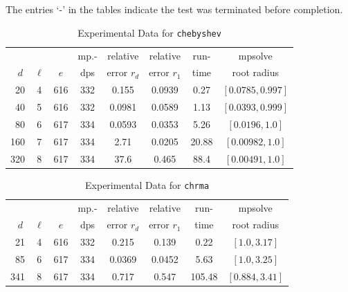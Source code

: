 \documentclass[runningheads]{llncs}
\begin{document}
 The entries `-' in the tables indicate the test was terminated before completion.


\begin{table}
\caption{Experimental Data for \texttt{chebyshev}} %
\label{tab:chebyshev}
\vskip -0.15in
\begin{center}
\begin{small}
\begin{sc}
\begin{tabular}{rccccccc}
\toprule
&  &  & mp.-& relative  & relative & run- & mpsolve \\
$d~$& $\ell$& $e$ & dps&error $r_d$       & error $r_1$ &time& root radius\\
\midrule
 20 & 4 & 616 & 332 & 0.155 & 0.0939 & 0.27 & $[0.0785, 0.997]$\\
 40 & 5 & 616 & 332 & 0.0981 & 0.0589 & 1.13 & $[0.0393, 0.999]$\\
 80 & 6 & 617 & 334 & 0.0593 & 0.0353 & 5.26 & $[0.0196, 1.0]$\\
 160 & 7 & 617 & 334 & 2.71 & 0.0205 & 20.88 & $[0.00982, 1.0]$\\
 320 & 8 & 617 & 334 & 37.6 & 0.465 & 88.4 & $[0.00491, 1.0]$\\
\bottomrule
\end{tabular}
\end{sc}
\end{small}
\end{center}
\vskip 0.05in
\end{table}

\begin{table}
\caption{Experimental Data for \texttt{chrma}} %
\label{tab:chrma}
\vskip -0.15in
\begin{center}
\begin{small}
\begin{sc}
\begin{tabular}{rccccccc}
\toprule
&  &  & mp.-& relative  & relative & run- & mpsolve \\
$d~$& $\ell$& $e$ & dps&error $r_d$       & error $r_1$ &time& root radius\\
\midrule
 21 & 4 & 616 & 332 & 0.215 & 0.139 & 0.22 & $[1.0, 3.17]$\\
 85 & 6 & 617 & 334 & 0.0369 & 0.0452 & 5.63 & $[1.0, 3.25]$\\
 341 & 8 & 617 & 334 & 0.717 & 0.547 & 105.48 & $[0.884, 3.41]$\\
\bottomrule
\end{tabular}
\end{sc}
\end{small}
\end{center}
\vskip 0.05in
\end{table}
\end{document}
